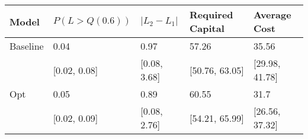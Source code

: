 \begin{tabular}{lllll}
\toprule
   Model & $P(L > Q(0.6))$ & $|L_2 - L_1|$ & Required Capital &   Average Cost \\
\midrule
Baseline &            0.04 &          0.97 &            57.26 &          35.56 \\
         &    [0.02, 0.08] &  [0.08, 3.68] &   [50.76, 63.05] & [29.98, 41.78] \\
     Opt &            0.05 &          0.89 &            60.55 &           31.7 \\
         &    [0.02, 0.09] &  [0.08, 2.76] &   [54.21, 65.99] & [26.56, 37.32] \\
\bottomrule
\end{tabular}
